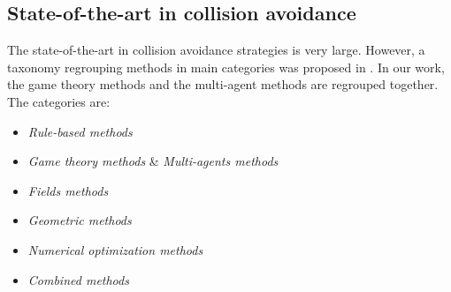 \subsection{State-of-the-art in collision avoidance}

The state-of-the-art in collision avoidance strategies is very large. However, a taxonomy regrouping methods in main categories was proposed in \cite{angelov_sense_2012}. In our work, the game theory methods and the multi-agent methods are regrouped together. The categories are:
\begin{itemize}
	\item \emph{Rule-based methods}
	\item \emph{Game theory methods} \& \emph{Multi-agents methods}
	\item \emph{Fields methods}
	\item \emph{Geometric methods}
	\item \emph{Numerical optimization methods}
	\item \emph{Combined methods}
\end{itemize}
